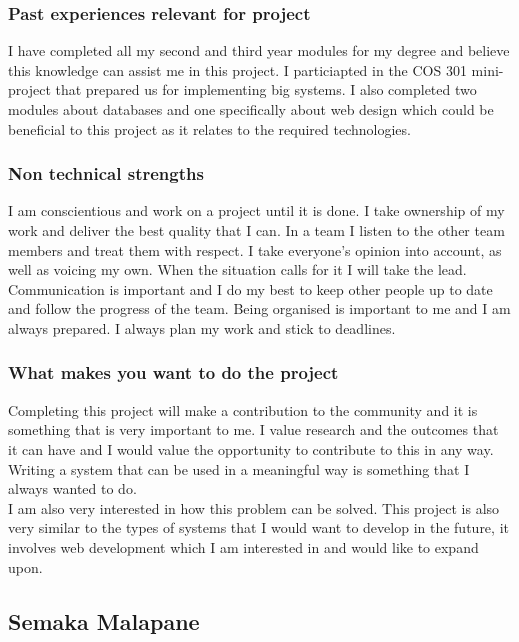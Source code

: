 \documentclass[hidelinks, 12pt, oneside]{article}
\begin{document}
\subsubsection{Past experiences relevant for project}
I have completed all my second and third year modules for my degree and believe this knowledge can assist me in this project. I particiapted in the COS 301 mini-project that prepared us for implementing big systems. I also completed two modules about databases and one specifically about web design which could be beneficial to this project as it relates to the required technologies. 
\subsubsection{Non technical strengths}
I am conscientious and work on a project until it is done. I take ownership of my work and deliver the best quality that I can. In a team I listen to the other team members and treat them with respect. I take everyone’s opinion into account, as well as voicing my own. When the situation calls for it I will take the lead. Communication is important and I do my best to keep other people up to date and follow the progress of the team. Being organised is important to me and I am always prepared. I always plan my work and stick to deadlines.
\subsubsection{What makes you want to do the project}
Completing this project will make a contribution to the community and it is something that is very important to me. I value research and the outcomes that it can have and I would value the opportunity to contribute to this in any way. Writing a system that can be used in a meaningful way is something that I always wanted to do. 
\\
I am also very interested in how this problem can be solved. This project is also very similar to the types of systems that I would want to develop in the future, it involves web development which I am interested in and would like to expand upon.

\subsection{Semaka Malapane}
\end{document}
